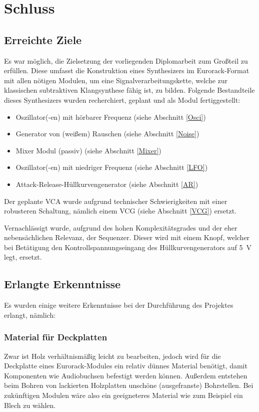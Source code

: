 \chapter{Schluss}

\section{Erreichte Ziele \label{goals}}
\label{sec:org2d47b19}
Es war möglich, die Zielsetzung der vorliegenden Diplomarbeit zum Großteil zu erfüllen. Diese umfasst die Konstruktion eines Synthesizers im Eurorack-Format mit allen nötigen Modulen, um eine Signalverarbeitungskette, welche zur klassischen subtraktiven Klangsynthese fähig ist, zu bilden. Folgende Bestandteile dieses Synthesizers wurden recherchiert, geplant und als Modul fertiggestellt:

\begin{itemize}
\item Oszillator(-en) mit hörbarer Frequenz (siehe Abschnitt \ref{Osci})
\item Generator von (weißem) Rauschen (siehe Abschnitt \ref{Noise})
\item Mixer Modul (passiv) (siehe Abschnitt \ref{Mixer})
\item Oszillator(-en) mit niedriger Frequenz (siehe Abschnitt \ref{LFO})
\item Attack-Release-Hüllkurvengenerator (siehe Abschnitt \ref{AR})
\end{itemize}

Der geplante \ac{VCA} wurde aufgrund technischer Schwierigkeiten mit einer robusteren Schaltung, nämlich einem \ac{VCG} (siehe Abschnitt \ref{VCG}) ersetzt.

Vernachlässigt wurde, aufgrund des hohen Komplexitätsgrades und der eher nebensächlichen Relevanz, der Sequenzer. Dieser wird mit einem Knopf, welcher bei Betätigung den Kontrollspannungseingang des Hüllkurvengenerators auf \SI{5}{\volt} legt, ersetzt.

\section{Erlangte Erkenntnisse}
\label{sec:org10d5b2c}
Es wurden einige weitere Erkenntnisse bei der Durchführung des Projektes erlangt, nämlich:

\subsection{Material für Deckplatten}
\label{sec:org3ba4df6}
Zwar ist Holz verhältnismäßig leicht zu bearbeiten, jedoch wird für die Deckplatte eines Eurorack-Modules ein relativ dünnes Material benötigt, damit Komponenten wie Audiobuchsen befestigt werden können. Außerdem entstehen beim Bohren von lackierten Holzplatten unschöne (ausgefranste) Bohrstellen. Bei zukünftigen Modulen wäre also ein geeigneteres Material wie zum Beispiel ein Blech zu wählen.


